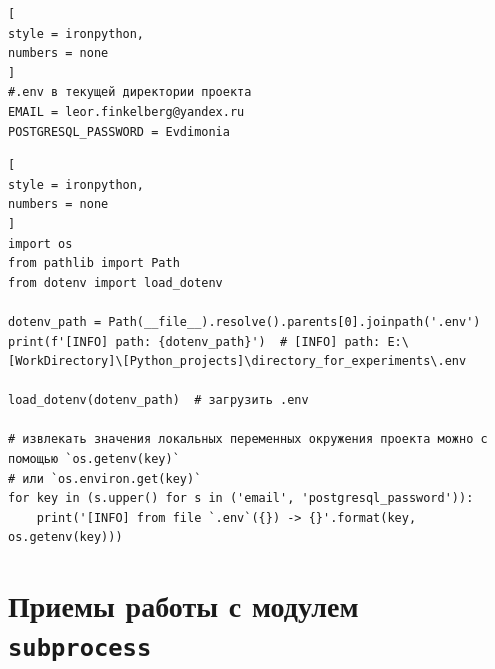 \documentclass[%
	11pt,
	a4paper,
	utf8,
		]{article}
\begin{document}
\begin{lstlisting}[
style = ironpython,
numbers = none
]
#.env в текущей директории проекта
EMAIL = leor.finkelberg@yandex.ru
POSTGRESQL_PASSWORD = Evdimonia
\end{lstlisting}

\begin{lstlisting}[
style = ironpython,
numbers = none
]
import os
from pathlib import Path
from dotenv import load_dotenv

dotenv_path = Path(__file__).resolve().parents[0].joinpath('.env')
print(f'[INFO] path: {dotenv_path}')  # [INFO] path: E:\[WorkDirectory]\[Python_projects]\directory_for_experiments\.env

load_dotenv(dotenv_path)  # загрузить .env

# извлекать значения локальных переменных окружения проекта можно с помощью `os.getenv(key)`
# или `os.environ.get(key)`
for key in (s.upper() for s in ('email', 'postgresql_password')):
    print('[INFO] from file `.env`({}) -> {}'.format(key, os.getenv(key)))
\end{lstlisting}

\section{Приемы работы с модулем \texttt{subprocess}}
\end{document}
